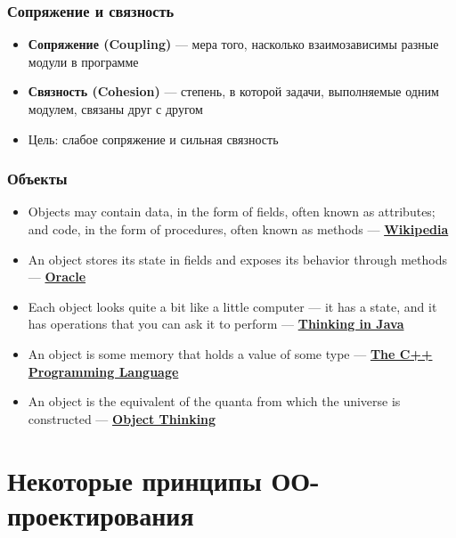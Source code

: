 \documentclass{../../slides-style}
\begin{document}
    \begin{frame}
        \frametitle{Сопряжение и связность}
        \begin{itemize}
            \item \textbf{Сопряжение (Coupling)} --- мера того, насколько взаимозависимы разные модули в программе
            \item \textbf{Связность (Cohesion)} --- степень, в которой задачи, выполняемые одним модулем, связаны друг с другом
            \item Цель: слабое сопряжение и сильная связность
        \end{itemize}
    \end{frame}

    \begin{frame}
        \frametitle{Объекты}
        \begin{itemize}
            \item Objects may contain data, in the form of fields, often known as attributes; and code, in the form of procedures, often known as methods --- \textbf{\href{https://en.wikipedia.org/wiki/Object-oriented\_programming}{Wikipedia}}
            \item An object stores its state in fields and exposes its behavior through methods --- \textbf{\href{https://docs.oracle.com/javase/tutorial/java/concepts/object.html}{Oracle}}
            \item Each object looks quite a bit like a little computer --- it has a state, and it has operations that you can ask it to perform --- \textbf{\href{http://amzn.to/1PBmQpm}{Thinking in Java}}
            \item An object is some memory that holds a value of some type --- \textbf{\href{http://amzn.to/1XyGCtk}{The C++ Programming Language}}
            \item An object is the equivalent of the quanta from which the universe is constructed --- \textbf{\href{http://amzn.to/266oJr4}{Object Thinking}}
        \end{itemize}
    \end{frame}

    \section{Некоторые принципы ОО-проектирования}
\end{document}
